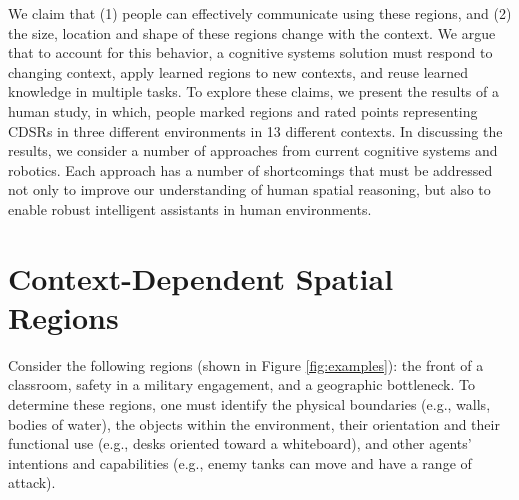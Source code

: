 \documentclass[11pt,letterpaper]{article}
\begin{document}
We claim that (1) people can effectively communicate using these regions, and (2) the size, location and shape of these regions change with the context.  We argue that to account for this behavior, a cognitive systems solution must respond to changing context, apply learned regions to new contexts, and reuse learned knowledge in multiple tasks.  To explore these claims, we present the results of a human study, in which, people marked regions and rated points representing CDSRs in three different environments in 13 different contexts.  In discussing the results, we consider a number of approaches from current cognitive systems and robotics.  Each approach has a number of shortcomings that must be addressed not only to improve our understanding of human spatial reasoning, but also to enable robust intelligent assistants in human environments.

\section{Context-Dependent Spatial Regions}\label{sec:cdsrs}

Consider the following regions (shown in Figure \ref{fig:examples}): the front of a classroom, safety in a military engagement, and a geographic bottleneck.  To determine these regions, one must identify the physical boundaries (e.g., walls, bodies of water), the objects within the environment, their orientation and their functional use (e.g., desks oriented toward a whiteboard), and other agents' intentions and capabilities (e.g., enemy tanks can move and have a range of attack).%
\end{document}

